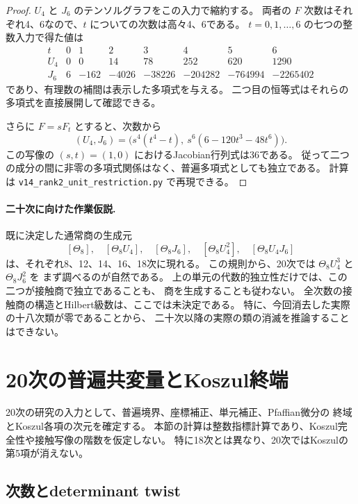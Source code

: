 \begin{proof}
$U_4$ と $J_6$ のテンソルグラフをこの入力で縮約する。
両者の $F$ 次数はそれぞれ4、6なので、$t$ についての次数は高々4、6である。
$t=0,1,\ldots,6$ の七つの整数入力で得た値は
\[
\begin{array}{c|rrrrrrr}
t&0&1&2&3&4&5&6\\\hline
U_4&0&0&14&78&252&620&1290\\
J_6&6&-162&-4026&-38226&-204282&-764994&-2265402
\end{array}
\]
であり、有理数の補間は表示した多項式を与える。
二つ目の恒等式はそれらの多項式を直接展開して確認できる。

さらに $F=sF_t$ とすると、次数から
\[
 (U_4,J_6)=\bigl(s^4(t^4-t),\ s^6(6-120t^3-48t^6)\bigr).
\]
この写像の $(s,t)=(1,0)$ におけるJacobian行列式は36である。
従って二つの成分の間に非零の多項式関係はなく、普遍多項式としても独立である。
計算は \texttt{v14\_rank2\_unit\_restriction.py} で再現できる。
\end{proof}

\paragraph{二十次に向けた作業仮説.}
既に決定した通常商の生成元
\[
 [\Theta_8],\quad[\Theta_8U_4],\quad[\Theta_8J_6],\quad
 [\Theta_8U_4^2],\quad[\Theta_8U_4J_6]
\]
は、それぞれ8、12、14、16、18次に現れる。
この規則から、20次では $\Theta_8U_4^3$ と $\Theta_8J_6^2$ を
まず調べるのが自然である。
上の単元の代数的独立性だけでは、この二つが接触商で独立であることも、
商を生成することも従わない。
全次数の接触商の構造とHilbert級数は、ここでは未決定である。
特に、今回消去した実際の十八次類が零であることから、
二十次以降の実際の類の消滅を推論することはできない。


\clearpage
\section{20次の普遍共変量とKoszul終端}
\label{sec:v15-twentieth-characters}

20次の研究の入力として、普遍境界、座標補正、単元補正、Pfaffian微分の
終域とKoszul各項の次元を確定する。
本節の計算は整数指標計算であり、Koszul完全性や接触写像の階数を仮定しない。
特に18次とは異なり、20次ではKoszulの第5項が消えない。

\subsection{次数とdeterminant twist}

